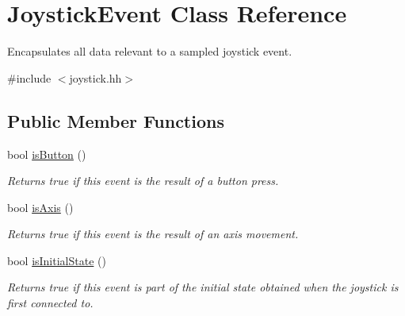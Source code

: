 \hypertarget{classJoystickEvent}{\section{\-Joystick\-Event \-Class \-Reference}
\label{classJoystickEvent}
}


\-Encapsulates all data relevant to a sampled joystick event.  




{\ttfamily \#include $<$joystick.\-hh$>$}

\subsection*{\-Public \-Member \-Functions}
\begin{DoxyCompactItemize}
\item 
\hypertarget{classJoystickEvent_aae34d965daafe3e45a0bbfd733866386}{bool \hyperlink{classJoystickEvent_aae34d965daafe3e45a0bbfd733866386}{is\-Button} ()}\label{classJoystickEvent_aae34d965daafe3e45a0bbfd733866386}

\begin{DoxyCompactList}\small\item\em \-Returns true if this event is the result of a button press. \end{DoxyCompactList}\item 
\hypertarget{classJoystickEvent_a0b82c33e3a562798595138bcffe02d6a}{bool \hyperlink{classJoystickEvent_a0b82c33e3a562798595138bcffe02d6a}{is\-Axis} ()}\label{classJoystickEvent_a0b82c33e3a562798595138bcffe02d6a}

\begin{DoxyCompactList}\small\item\em \-Returns true if this event is the result of an axis movement. \end{DoxyCompactList}\item 
\hypertarget{classJoystickEvent_a33df9d4e8ffc2a83e96fda2010a5d7ca}{bool \hyperlink{classJoystickEvent_a33df9d4e8ffc2a83e96fda2010a5d7ca}{is\-Initial\-State} ()}\label{classJoystickEvent_a33df9d4e8ffc2a83e96fda2010a5d7ca}

\begin{DoxyCompactList}\small\item\em \-Returns true if this event is part of the initial state obtained when the joystick is first connected to. \end{DoxyCompactList}\end{DoxyCompactItemize}
